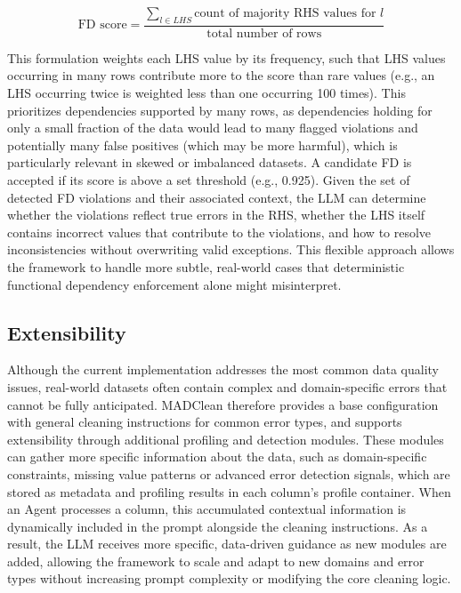 \[
\text{FD score} = \frac{\sum_{l \in LHS} \text{count of majority RHS values for } l}{\text{total number of rows}}
\]

This formulation weights each LHS value by its frequency, such that LHS values occurring in many rows contribute more to the score than rare values (e.g., an LHS occurring twice is weighted less than one occurring 100 times).
This prioritizes dependencies supported by many rows, as dependencies holding for only a small fraction of the data would lead to many flagged violations and potentially many false positives (which may be more harmful), which is particularly relevant in skewed or imbalanced datasets.
A candidate FD is accepted if its score is above a set threshold (e.g., 0.925). 
\newline\newline
Given the set of detected FD violations and their associated context, the LLM can determine whether the violations reflect true errors in the RHS, whether the LHS itself contains incorrect values that contribute to the violations, and how to resolve inconsistencies without overwriting valid exceptions. 
This flexible approach allows the framework to handle more subtle, real-world cases that deterministic functional dependency enforcement alone might misinterpret.

\subsection{Extensibility}
Although the current implementation addresses the most common data quality issues, real-world datasets often contain complex and domain-specific errors that cannot be fully anticipated. 
MADClean therefore provides a base configuration with general cleaning instructions for common error types, and supports extensibility through additional profiling and detection modules.
These modules can gather more specific information about the data, such as domain-specific constraints, missing value patterns or advanced error detection signals, which are stored as metadata and profiling results in each column's profile container.
When an Agent processes a column, this accumulated contextual information is dynamically included in the prompt alongside the cleaning instructions.
As a result, the LLM receives more specific, data-driven guidance as new modules are added, allowing the framework to scale and adapt to new domains and error types without increasing prompt complexity or modifying the core cleaning logic.

